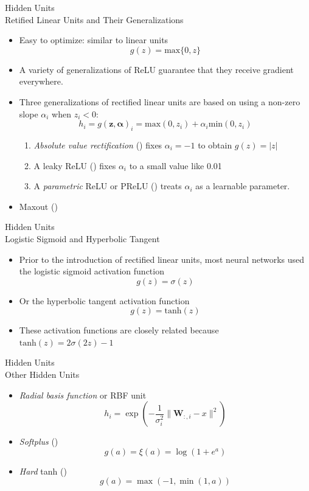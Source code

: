 \documentclass[10pt]{beamer}
\begin{document}
	\begin{frame}{Hidden Units \\ Retified Linear Units and Their Generalizations}
		\begin{itemize}
			\item Easy to optimize: similar to linear units
			$$g(z)=\mathrm{max}\{0,z\}$$
			
			\pause
			\item A variety of generalizations of ReLU guarantee that they receive gradient everywhere.
			\pause
			\item Three generalizations of rectified linear units are based on using a non-zero slope $\alpha_i$ when $z_i<0$:
			$$h_i=g(\bm{z},\bm{\alpha})_i=\mathrm{max}(0,z_i)+\alpha_i\mathrm{min}(0,z_i)$$
			
			\pause
			\begin{enumerate}
			 	\item \emph{Absolute value rectification} (\citet{jarrett2009best}) fixes $\alpha_i=-1$ to obtain $g(z)=|z|$
			 	\item A leaky ReLU (\citet{maas2013rectifier}) fixes $\alpha_i$ to a small value like 0.01 
			 	\item A \emph{parametric} ReLU or PReLU (\citet{he2015delving}) treats $\alpha_i$ as a learnable parameter.
			\end{enumerate}
			\pause
		 	\item Maxout (\citet{goodfellow2013maxout})
		\end{itemize}
	\end{frame}

	\begin{frame}{Hidden Units \\ Logistic Sigmoid and Hyperbolic Tangent}
		\begin{itemize}
			\item Prior to the introduction of rectified linear units, most neural networks used the logistic sigmoid activation function 
			$$g(z)=\sigma(z)$$
			\item Or the hyperbolic tangent activation function
			$$g(z)=\mathrm{tanh}(z)$$
			\item These activation functions are closely related because $\mathrm{tanh}(z)=2\sigma(2z)-1$
		\end{itemize}
	\end{frame}
	
	\begin{frame}{Hidden Units \\ Other Hidden Units}
		\begin{itemize}
			\item \emph{Radial basis function} or RBF unit
			$$h_i=\exp\left(-\frac{1}{\sigma_i^2}\lVert\bm{W}_{:,i}-x\rVert^2\right)$$
			\item \emph{Softplus} (\citet{dugas2001incorporating})
			$$g(a)=\xi(a)=\log(1+e^a)$$
			\item \emph{Hard} tanh (\citet{collobert2004large})
			$$g(a)=\max(-1,\min(1,a))$$
		\end{itemize}
	\end{frame}
\end{document}
